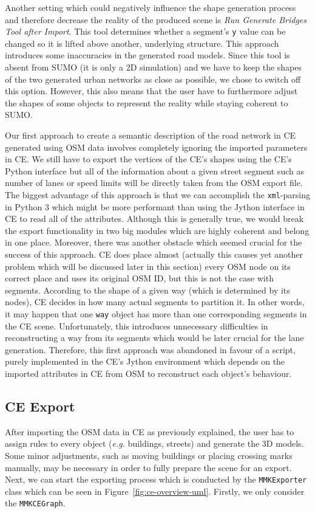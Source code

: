 Another setting which could negatively influence the shape generation process and therefore decrease the reality of the produced scene is \emph{Run Generate Bridges Tool after Import}. This tool determines whether a segment's \texttt{y} value can be changed so it is lifted above another, underlying structure. This approach introduces some inaccuracies in the generated road models. Since this tool is absent from SUMO (it is only a 2D simulation) and we have to keep the shapes of the two generated urban networks as close as possible, we chose to switch off this option. However, this also means that the user have to furthermore adjust the shapes of some objects to represent the reality while staying coherent to SUMO.

Our first approach to create a semantic description of the road network in CE generated using OSM data involves completely ignoring the imported parameters in CE. We still have to export the vertices of the CE's shapes using the CE's Python interface but all of the information about a given street segment such as number of lanes or speed limits will be directly taken from the OSM export file. The biggest advantage of this approach is that we can accomplish the \texttt{xml}-parsing in Python 3 which might be more performant than using the Jython interface in CE to read all of the attributes. Although this is generally true, we would break the export functionality in two big modules which are highly coherent and belong in one place. Moreover, there was another obstacle which seemed crucial for the success of this approach. CE does place almost (actually this causes yet another problem which will be discussed later in this section) every OSM node on its correct place and uses its original OSM ID, but this is not the case with segments. According to the shape of a given way (which is determined by its nodes), CE decides in how many actual segments to partition it. In other words, it may happen that one \texttt{way} object has more than one corresponding segments in the CE scene. Unfortunately, this introduces unnecessary difficulties in reconstructing a way from its segments which would be later crucial for the lane generation. Therefore, this first approach was abandoned in favour of a script, purely implemented in the CE's Jython environment which depends on the imported attributes in CE from OSM to reconstruct each object's behaviour. 

\subsection{CE Export}
After importing the OSM data in CE as previously explained, the user has to assign rules to every object (\emph{e.g.} buildings, streets) and generate the 3D models. Some minor adjustments, such as moving buildings or placing crossing marks manually, may be necessary in order to fully prepare the scene for an export. Next, we can start the exporting process which is conducted by the \texttt{MMKExporter} class which can be seen in Figure~\ref{fig:ce-overview-uml}. Firstly, we only consider the \texttt{MMKCEGraph}. 

